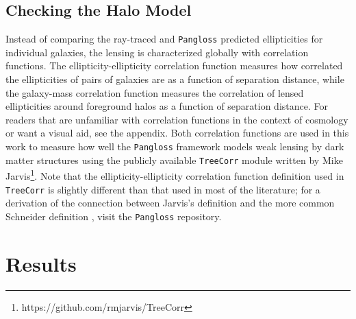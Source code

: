 \documentclass[%
 reprint,
 amsmath,amssymb,
 aps,nofootinbib
]{revtex4-1}
\begin{document}
\subsection*{Checking the Halo Model}

Instead of comparing the ray-traced and \texttt{Pangloss} predicted ellipticities for individual galaxies, the lensing is characterized globally with correlation functions. The ellipticity-ellipticity correlation function measures how correlated the ellipticities of pairs of galaxies are as a function of separation distance, while the galaxy-mass correlation function measures the correlation of lensed ellipticities around foreground halos as a function of separation distance. For readers that are unfamiliar with correlation functions in the context of cosmology or want a visual aid, see the appendix. Both correlation functions are used in this work to measure how well the \texttt{Pangloss} framework models weak lensing by dark matter structures using the publicly available \texttt{TreeCorr} module written by Mike Jarvis\footnote{https://github.com/rmjarvis/TreeCorr}. Note that the ellipticity-ellipticity correlation function definition used in \texttt{TreeCorr} is slightly different than that used in most of the literature; for a derivation of the connection between Jarvis's definition and the more common Schneider definition \cite{schneider}, visit the \texttt{Pangloss} repository\footnotemark[\ref{note1}].

\section{Results}
\end{document}
